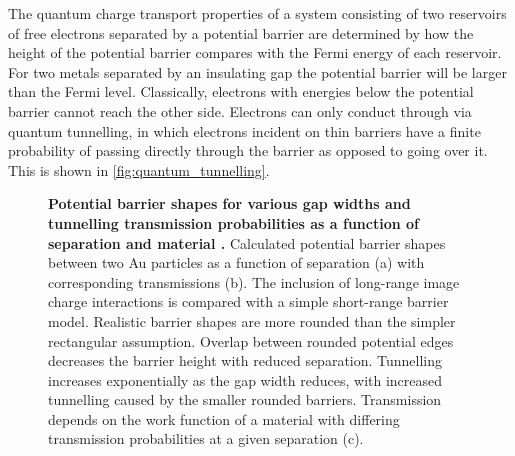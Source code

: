\documentclass{article}
\begin{document}
The quantum charge transport properties of a system consisting of two reservoirs of free electrons separated by a potential barrier are determined by how the height of the potential barrier compares with the Fermi energy of each reservoir. For two metals separated by an insulating gap the potential barrier will be larger than the Fermi level. Classically, electrons with energies below the potential barrier cannot reach the other side. Electrons can only conduct through via quantum tunnelling, in which electrons incident on thin barriers have a finite probability of passing directly through the barrier as opposed to going over it. This is shown in \autoref{fig:quantum_tunnelling}.

\begin{figure}[bt]
\centering
{}
\caption[Potential barrier shapes for various gap widths and tunnelling transmission probabilities as a function of separation and material \cite{esteban2015}]{\textbf{Potential barrier shapes for various gap widths and tunnelling transmission probabilities as a function of separation and material \cite{esteban2015}.} Calculated potential barrier shapes between two Au particles as a function of separation (a) with corresponding transmissions (b). The inclusion of long-range image charge interactions is compared with a simple short-range barrier model. Realistic barrier shapes are more rounded than the simpler rectangular assumption. Overlap between rounded potential edges decreases the barrier height with reduced separation. Tunnelling increases exponentially as the gap width reduces, with increased tunnelling caused by the smaller rounded barriers. Transmission depends on the work function of a material with differing transmission probabilities at a given separation (c).}
\label{fig:esteban_tunnelling}
\end{figure}
\end{document}
